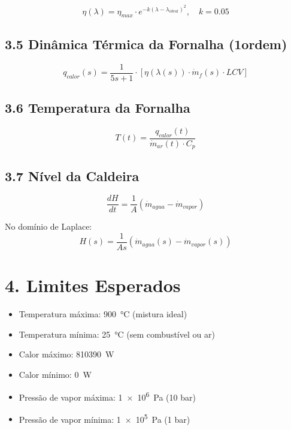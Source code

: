 \documentclass[12pt]{article}
\begin{document}
\begin{equation}
\eta(\lambda) = \eta_{max} \cdot e^{-k(\lambda - \lambda_{ideal})^2}, \quad k = 0.05
\end{equation}

\subsection*{3.5 Din\^amica T\'ermica da Fornalha (1\textordfeminine ordem)}
\begin{equation}
q_{calor}(s) = \frac{1}{5s + 1} \cdot \left[ \eta(\lambda(s)) \cdot \dot{m}_f(s) \cdot LCV \right]
\end{equation}

\subsection*{3.6 Temperatura da Fornalha}
\begin{equation}
T(t) = \frac{q_{calor}(t)}{\dot{m}_{ar}(t) \cdot C_p}
\end{equation}

\subsection*{3.7 N\'ivel da Caldeira}
\begin{equation}
\frac{dH}{dt} = \frac{1}{A} (\dot{m}_{agua} - \dot{m}_{vapor})
\end{equation}

No dom\'inio de Laplace:
\begin{equation}
H(s) = \frac{1}{A s} (\dot{m}_{agua}(s) - \dot{m}_{vapor}(s))
\end{equation}

\section*{4. Limites Esperados}
\begin{itemize}
    \item Temperatura m\'axima: \SI{900}{\celsius} (mistura ideal)
    \item Temperatura m\'inima: \SI{25}{\celsius} (sem combust\'ivel ou ar)
    \item Calor m\'aximo: \SI{810390}{W}
    \item Calor m\'inimo: \SI{0}{W}
    \item Press\~ao de vapor m\'axima: \SI{1e6}{Pa} (10 bar)
    \item Press\~ao de vapor m\'inima: \SI{1e5}{Pa} (1 bar)
\end{itemize}
\end{document}
